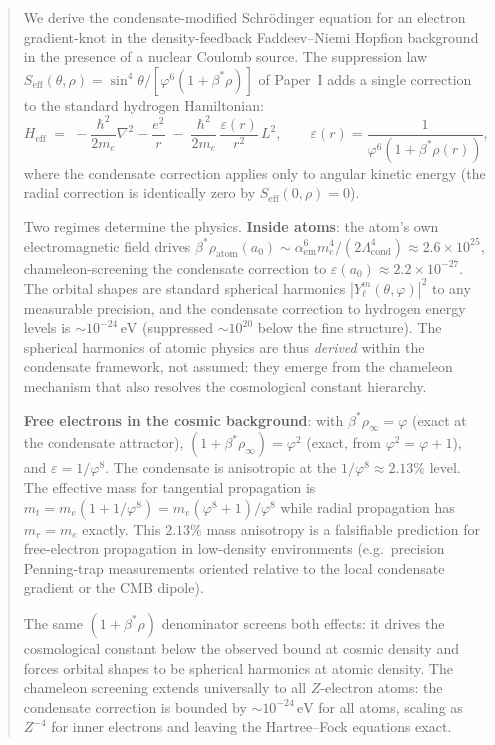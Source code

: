 \documentclass[11pt,a4paper]{article}
\theoremstyle{definition}
\theoremstyle{remark}
\newcommand{\vp}{\varphi}
\newcommand{\bst}{\beta^{*}}
\newcommand{\Lcond}{\Lambda_{\mathrm{cond}}}
\newcommand{\aem}{\alpha_{\mathrm{em}}}
\newcommand{\eps}{\varepsilon}
\newcommand{\Heff}{H_{\mathrm{eff}}}
\newcommand{\Seff}{S_{\mathrm{eff}}}
\newcommand{\epsr}{\varepsilon(r)}
\begin{document}
\begin{abstract}
We derive the condensate-modified Schr\"odinger equation for an electron
gradient-knot in the density-feedback Faddeev--Niemi Hopfion background
in the presence of a nuclear Coulomb source.
The suppression law $\Seff(\theta,\rho)=\sin^4\!\theta/[\vp^6(1+\bst\rho)]$
of Paper~I adds a single correction to the standard hydrogen Hamiltonian:
\[
  \Heff \;=\; -\frac{\hbar^2}{2m_e}\nabla^2 - \frac{e^2}{r}
  \;-\; \frac{\hbar^2}{2m_e}\,\frac{\epsr}{r^2}\,L^2,
  \qquad
  \epsr = \frac{1}{\vp^6(1+\bst\rho(r))},
\]
where the condensate correction applies only to angular kinetic energy
(the radial correction is identically zero by $\Seff(0,\rho)=0$).

Two regimes determine the physics.
\textbf{Inside atoms}: the atom's own electromagnetic field drives
$\bst\rho_{\mathrm{atom}}(a_0)\sim\aem^6 m_e^4/(2\Lcond^4)\approx2.6\times10^{25}$,
chameleon-screening the condensate correction to
$\eps(a_0)\approx2.2\times10^{-27}$.
The orbital shapes are standard spherical harmonics
$|Y_\ell^m(\theta,\varphi)|^2$ to any measurable precision, and the
condensate correction to hydrogen energy levels is $\sim10^{-24}\,\mathrm{eV}$
(suppressed $\sim10^{20}$ below the fine structure).
The spherical harmonics of atomic physics are thus \emph{derived} within
the condensate framework, not assumed: they emerge from the chameleon
mechanism that also resolves the cosmological constant hierarchy.

\textbf{Free electrons in the cosmic background}: with $\bst\rho_\infty = \vp$
(exact at the condensate attractor), $(1+\bst\rho_\infty) = \vp^2$
(exact, from $\vp^2=\vp+1$), and $\eps = 1/\vp^8$.
The condensate is anisotropic at the $1/\vp^8\approx2.13\%$ level.
The effective mass for tangential propagation is
$m_t = m_e(1+1/\vp^8) = m_e(\vp^8+1)/\vp^8$
while radial propagation has $m_r = m_e$ exactly.
This $2.13\%$ mass anisotropy is a falsifiable prediction for
free-electron propagation in low-density environments
(e.g.\ precision Penning-trap measurements oriented relative to the
local condensate gradient or the CMB dipole).

The same $(1+\bst\rho)$ denominator screens both effects: it drives
the cosmological constant below the observed bound at cosmic density
and forces orbital shapes to be spherical harmonics at atomic density.
The chameleon screening extends universally to all $Z$-electron atoms:
the condensate correction is bounded by $\sim10^{-24}\,\mathrm{eV}$
for all atoms, scaling as $Z^{-4}$ for inner electrons
and leaving the Hartree--Fock equations exact.


\end{abstract}
\end{document}
